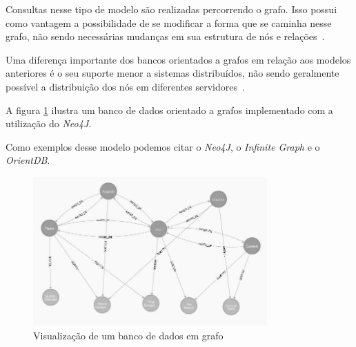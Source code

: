 Consultas nesse tipo de modelo são realizadas percorrendo o grafo. Isso possui como vantagem a possibilidade de se modificar a forma que se caminha nesse grafo, não sendo necessárias mudanças em sua estrutura de nós e relações~\cite{pramod}.

Uma diferença importante dos bancos orientados a grafos em relação aos modelos anteriores é o seu suporte menor a sistemas distribuídos, não sendo geralmente possível a distribuição dos nós em diferentes servidores~\cite{pramod}.

A figura \ref{fig:graphneo4j} ilustra um banco de dados orientado a grafos implementado com a utilização do \emph{Neo4J}.

Como exemplos desse modelo podemos citar o \emph{Neo4J}, o \emph{Infinite Graph} e o \emph{OrientDB}.


\begin{figure}[!htb]
\centering
\includegraphics[width=0.8\textwidth]{figuras/graph.jpg}
\caption{Visualização de um banco de dados em grafo}
\label{fig:graphneo4j}
\end{figure}